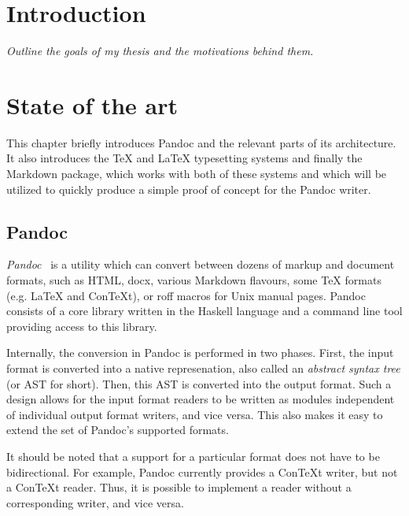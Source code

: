\documentclass[
  digital,     %
  oneside,     %
  nosansbold,  %
  nocolorbold, %
  lof,         %
  nolot,       %
]{fithesis4}
\begin{document}

\chapter{Introduction}
\emph{Outline the goals of my thesis and the motivations behind them.}

\chapter{State of the art}
This chapter briefly introduces Pandoc and the relevant parts of its architecture. It also introduces the \TeX{} and \LaTeX{} typesetting systems and finally the Markdown package, which works with both of these systems and which will be utilized to quickly produce a simple proof of concept for the Pandoc writer.

\section{Pandoc}
\emph{Pandoc}~\cite{pandoc} is a utility which can convert between dozens of markup and document formats, such as HTML, docx, various Markdown flavours, some \TeX{} formats (e.g. \LaTeX{} and Con\TeX{}t), or roff macros for Unix manual pages. Pandoc consists of a core library written in the Haskell language and a command line tool providing access to this library.

Internally, the conversion in Pandoc is performed in two phases. First, the input format is converted into a native represenation, also called an \emph{abstract syntax tree} (or AST for short). Then, this AST is converted into the output format. Such a design allows for the input format readers to be written as modules independent of individual output format writers, and vice versa. This also makes it easy to extend the set of Pandoc's supported formats.

It should be noted that a support for a particular format does not have to be bidirectional. For example, Pandoc currently provides a Con\TeX{}t writer, but not a Con\TeX{}t reader. Thus, it is possible to implement a reader without a corresponding writer, and vice versa.
\end{document}
